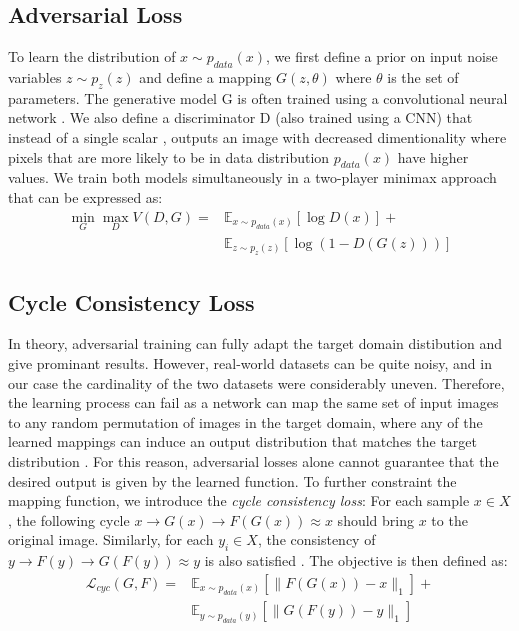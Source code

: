 \documentclass[10pt,twocolumn,letterpaper]{article}
\begin{document}
\subsection{Adversarial Loss}
To learn the distribution of $x \sim p_{data}(x)$, we first define a prior on input noise variables $z \sim p_{z}(z)$ and define a mapping $G(z,\theta)$ where $\theta$ is the set of parameters. The generative model G is often trained using a convolutional neural network \cite{cnn}. We also define a discriminator D (also trained using a CNN) that instead of a single scalar \cite{simplegan}, outputs an image with decreased dimentionality where pixels that are more likely to be in data distribution $p_{data}(x)$ have higher values. We train both models simultaneously in a two-player minimax approach that can be expressed as:
\begin{equation}
	\begin{split}
		\min_G \max_D V(D,G) = &\mathbb{E}_{x \sim p_{data}(x)}[\log{D(x)}]+ \\
		&\mathbb{E}_{z \sim p_{z}(z)}[\log{(1-D(G(z)))}]
	\end{split}
\end{equation}

\subsection{Cycle Consistency Loss}
In theory, adversarial training can fully adapt the target domain distibution and give prominant results. However, real-world datasets can be quite noisy, and in our case the cardinality of the two datasets were considerably uneven. Therefore, the learning process can fail as a network can map the same set of input images to any random permutation of images in the target domain, where any of the learned mappings can induce an output distribution that matches the target distribution \cite{cyclegan}. For this reason, adversarial losses alone cannot guarantee that the desired output is given by the learned function. To further constraint the mapping function, we introduce the \emph{cycle consistency loss}: For each sample $x \in X$, the following cycle $x \rightarrow G(x)\rightarrow F(G(x)) \approx x$ should bring $x$ to the original image. Similarly, for each $y_{i}\in X$, the consistency of $y \rightarrow F(y)\rightarrow G(F(y)) \approx y$ is also satisfied \cite{cyclegan}. The objective is then defined as:
\begin{equation}
	\begin{split}
		\mathcal{L}_{cyc}(G,F) = & \mathbb{E}_{x \sim p_{data}(x)} [\| F(G(x))-x \| _1] + \\
				& \mathbb{E}_{y \sim p_{data}(y)} [\| G(F(y))-y \| _1]
	\end{split}
\end{equation}
\end{document}
